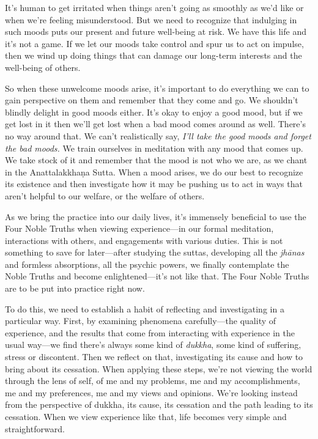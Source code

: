 It's human to get irritated when things aren't going as smoothly as 
we'd like or when we're feeling misunderstood. But we need to recognize 
that indulging in such moods puts our present and future well-being at 
risk. We have this life and it's not a game. If we let our moods take 
control and spur us to act on impulse, then we wind up doing things 
that can damage our long-term interests and the well-being of others.

So when these unwelcome moods arise, it's important to do everything we 
can to gain perspective on them and remember that they come and go. We 
shouldn't blindly delight in good moods either. It's okay to enjoy a 
good mood, but if we get lost in it then we'll get lost when a bad mood 
comes around as well. There's no way around that. We can't 
realistically say, \emph{I'll take the good moods and forget the bad 
moods.} We train ourselves in meditation with any mood that comes up. 
We take stock of it and remember that the mood is not who we are, as we 
chant in the Anattalakkhaṇa Sutta. When a mood arises, we do our best 
to recognize its existence and then investigate how it may be pushing 
us to act in ways that aren't helpful to our welfare, or the welfare of 
others.


As we bring the practice into our daily lives, it's immensely 
beneficial to use the Four Noble Truths when viewing experience---in 
our formal meditation, interactions with others, and engagements with 
various duties. This is not something to save for later---after 
studying the suttas, developing all the \emph{jhānas} and formless 
absorptions, all the psychic powers, we finally contemplate the Noble 
Truths and become enlightened---it's not like that. The Four Noble 
Truths are to be put into practice right now.

To do this, we need to establish a habit of reflecting and 
investigating in a particular way. First, by examining phenomena 
carefully---the quality of experience, and the results that come from 
interacting with experience in the usual way---we find there's always 
some kind of \emph{dukkha}, some kind of suffering, stress or 
discontent. Then we reflect on that, investigating its cause and how to 
bring about its cessation. When applying these steps, we're not viewing 
the world through the lens of self, of me and my problems, me and my 
accomplishments, me and my preferences, me and my views and opinions. 
We're looking instead from the perspective of dukkha, its cause, its 
cessation and the path leading to its cessation. When we view 
experience like that, life becomes very simple and straightforward.

